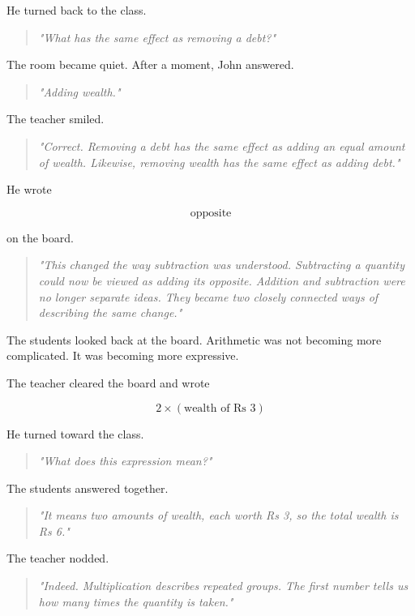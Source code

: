 \documentclass[11pt]{article}
\begin{document}
He turned back to the class.

\begin{quote}
\emph{"What has the same effect as removing a debt?"}
\end{quote}

The room became quiet. After a moment, John answered.

\begin{quote}
\emph{"Adding wealth."}
\end{quote}

The teacher smiled.

\begin{quote}
\emph{"Correct. Removing a debt has the same effect as adding an equal amount of wealth. Likewise, removing wealth has the same effect as adding debt."}
\end{quote}

He wrote

\[
\text{opposite}
\]

on the board.

\begin{quote}
\emph{"This changed the way subtraction was understood. Subtracting a quantity could now be viewed as adding its opposite. Addition and subtraction were no longer separate ideas. They became two closely connected ways of describing the same change."}
\end{quote}

The students looked back at the board. Arithmetic was not becoming more complicated. It was becoming more expressive.

The teacher cleared the board and wrote

\[
2\times(\text{wealth of Rs 3})
\]

He turned toward the class.

\begin{quote}
\emph{"What does this expression mean?"}
\end{quote}

The students answered together.

\begin{quote}
\emph{"It means two amounts of wealth, each worth Rs 3, so the total wealth is Rs 6."}
\end{quote}

The teacher nodded.

\begin{quote}
\emph{"Indeed. Multiplication describes repeated groups. The first number tells us how many times the quantity is taken."}
\end{quote}
\end{document}
